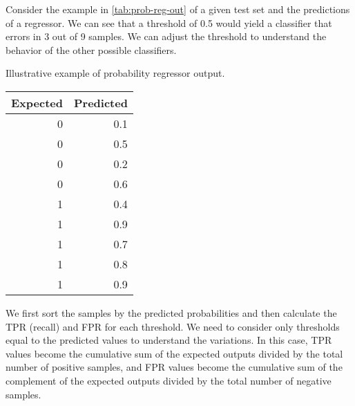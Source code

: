 Consider the example in \cref{tab:prob-reg-out} of a given test set and the predictions of
a regressor. We can see that a threshold of 0.5 would yield a classifier that errors
in 3 out of 9 samples.  We can adjust the threshold to understand the behavior of the
other possible classifiers.

\begin{tablebox}[label=tab:prob-reg-out]{Illustrative example of probability regressor
  output.}
  \centering
  \begin{tabular}{rr}
    \toprule
    \textbf{Expected} & \textbf{Predicted} \\
    \midrule
    0 & 0.1  \\
    0 & 0.5  \\
    0 & 0.2  \\
    0 & 0.6  \\
    1 & 0.4  \\
    1 & 0.9  \\
    1 & 0.7  \\
    1 & 0.8  \\
    1 & 0.9  \\
    \bottomrule
  \end{tabular}
\end{tablebox}

We first sort the samples by the predicted probabilities and then calculate the TPR
(recall) and FPR for each threshold.  We need to consider only thresholds equal to the
predicted values to understand the variations.  In this case, TPR values become the
cumulative sum of the expected outputs divided by the total number of positive samples,
and FPR values become the cumulative sum of the complement of the expected outputs
divided by the total number of negative samples.


